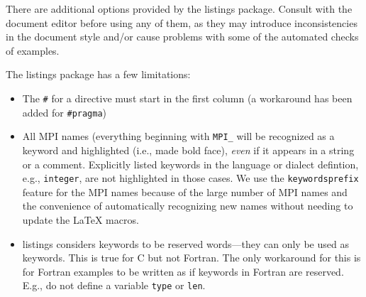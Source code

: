 \documentclass[letterpaper,twoside,11pt,fleqn]{article}
\begin{document}
There are additional options provided by the listings package.
Consult with the document editor before using any of them, as they may
introduce inconsistencies in the document style and/or cause problems with
some of the automated checks of examples.

The listings package has a few limitations:
\begin{itemize}
\item The \texttt{\#} for a directive must start in the first column
  (a workaround has been added for \texttt{\#pragma})
\item All MPI names (everything beginning with \texttt{MPI\_} will be
  recognized as a keyword and highlighted (i.e., made bold face),
  \emph{even} if it appears in a string or a comment.  Explicitly
  listed keywords in the language or dialect defintion, e.g.,
  \texttt{integer}, are not highlighted in those cases. We use the
  \texttt{keywordsprefix} feature for the MPI names because of the
  large number of MPI names and the convenience of automatically
  recognizing new names without needing to update the LaTeX macros.
\item listings considers keywords to be reserved words---they can only
  be used as keywords.  This is true for C but not Fortran. The only
  workaround for this is for Fortran examples to be written as if
  keywords in Fortran are reserved.  E.g., do not define a variable
  \texttt{type} or \texttt{len}.
\end{itemize}
\end{document}
